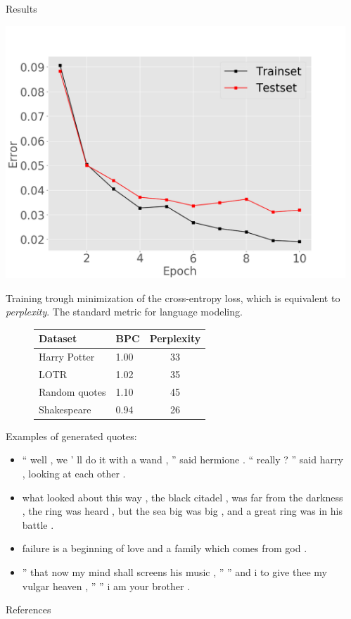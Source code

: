 \documentclass[final]{beamer}
\newcommand{\compresslist}{
  \setlength{\itemsep}{1pt}
  \setlength{\parskip}{0pt}
  \setlength{\parsep}{0pt}}
\newlength{\sepwidth}
\newlength{\colwidth}
\newcommand{\separatorcolumn}{\begin{column}{\sepwidth}\end{column}}
\begin{document}
\begin{frame}[t]
\begin{columns}[t]
\begin{column}{\colwidth}
\begin{block}{Results}
 \begin{center}
	\includegraphics[width=.7\linewidth]{classerror}
\end{center}

Training trough minimization of the cross-entropy loss, which is equivalent to
\textit{perplexity}.  The standard metric for language
modeling\cite{gravesGenerating}.
\begin{figure}[htbp!]
\begin{tabular}{|l|l|c|}
\hline
Dataset & BPC & Perplexity \\
\hline
Harry Potter & 1.00 & 33 \\
LOTR & 1.02 & 35 \\
Random quotes & 1.10 & 45 \\
Shakespeare & 0.94 & 26\\
\hline
\end{tabular}
\end{figure}

Examples of generated quotes:
\begin{itemize}\compresslist
    \item `` well , we ' ll do it with a wand , '' said hermione . `` really ?
      '' said harry , looking at each other .
    \item  what looked about this
      way , the black citadel , was far from the
          darkness , the ring was heard , but the sea big was big , and a great
          ring was in his battle .
    \item failure is a beginning of love and a family which comes from god .
    \item  '' that now my mind shall screens his music , '' '' and i to give
      thee my vulgar heaven , '' '' i am your brother .
\end{itemize}
\end{block}
\begin{block}{References}
\printbibliography
\end{block}
\end{column}
\separatorcolumn
\end{columns}
\end{frame}
\end{document}
